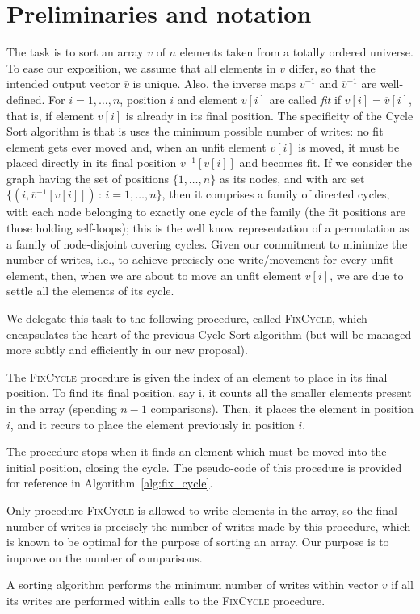 
\section{Preliminaries and notation}

The task is to sort an array $v$ of $n$ elements taken from a totally ordered universe.
To ease our exposition, we assume that all elements in $v$ differ, so that the intended output vector $\overline{v}$ is unique. 
Also, the inverse maps $v^{-1}$ and $\overline{v}^{-1}$ are well-defined.
For $i=1,\dots,n$, position $i$ and element $v[i]$ are called \emph{fit} if $v[i]=\overline{v}[i]$, that is, if element $v[i]$ is already in its final position. 
The specificity of the Cycle Sort algorithm is that is uses the minimum possible number of writes: no fit element gets ever moved and, when an unfit element $v[i]$ is moved, it must be placed directly in its final position $\overline{v}^{-1}[v[i]]$ and becomes fit. If we consider the graph having the set of positions $\{1,\ldots,n\}$ as its nodes, and with arc set $\{(i,\overline{v}^{-1}[v[i]]) \, : \, i=1,\ldots, n\}$, then it comprises a family of directed cycles, with each node belonging to exactly one cycle of the family (the fit positions are those holding self-loops); this is the well know representation of a permutation as a family of node-disjoint covering cycles. Given our commitment to minimize the number of writes, i.e., to achieve precisely one write/movement for every unfit element, then, when we are about to move an unfit element $v[i]$, we are due to settle all the elements of its cycle.

We delegate this task to the following procedure, called \textsc{FixCycle}, which encapsulates the heart of the previous Cycle Sort algorithm (but will be managed more subtly and efficiently in our new proposal).

The \textsc{FixCycle} procedure is given the index of an element to place in its final position.
To find its final position, say i, it counts all the smaller
elements present in the array (spending $n-1$ comparisons).
Then, it places the element in position $i$, and it recurs to place the
element previously in position $i$.

The procedure stops when it finds an element which must be moved into the initial position, closing the cycle.
The pseudo-code of this procedure is provided for reference in Algorithm~\ref{alg:fix_cycle}.

Only procedure \textsc{FixCycle} is allowed to write elements in the array, so the final number of writes is precisely the number of writes made by this procedure, which is known to be optimal for the purpose of sorting an array.
Our purpose is to improve on the number of comparisons.



\begin{lemma}
\label{lm_fixcycle}
A sorting algorithm performs the minimum number of writes within 
vector $v$ if all its writes are performed within calls to the \textsc{FixCycle}
procedure.
\end{lemma}